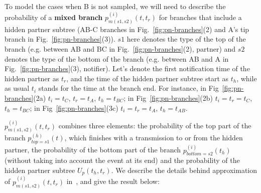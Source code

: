 \documentclass[10pt,letterpaper]{article}
\begin{document}
To model the cases when B is not sampled, we will need to describe the probability of a\textbf{ mixed branch} $p_{m(s1,s2)}^{(i)}(t,t_r)$ for branches that include a hidden partner subtree (AB-C branches in Fig.~\ref{fig:pn-branches}(2) and A's tip branch in Fig.~\ref{fig:pn-branches}(3)). $s1$ here denotes the type of the top of the branch (e.g. between AB and BC in Fig.~\ref{fig:pn-branches}(2), partner) and $s2$ denotes the type of the bottom of the branch (e.g. between AB and A in Fig.~\ref{fig:pn-branches}(3), notifier). Let's denote the first notification time of the hidden partner as $t_r$, and the time of the hidden partner subtree start as $t_h$, while as usual $t_i$ stands for the time at the branch end.  For instance, in Fig~\ref{fig:pn-branches}(2a) $t_i=t_C$, $t_r=t_A$, $t_h=t_{BC}$; in Fig~\ref{fig:pn-branches}(2b) $t_i=t_r=t_C$, $t_h=t_{BC}$; in Fig~\ref{fig:pn-branches}(3c) $t_i=t_r=t_A$, $t_h=t_{AB}$. 

$p_{m(s1,s2)}^{(i)}(t,t_r)$ combines three elements: the probability of the top part of the branch $p_{top=s1}^{(h)}(t)$, which finishes with a transmission to or from the hidden partner, the probability of the bottom part of the branch $p_{bottom=s2}^{(i)}(t_h)$ (without taking into account the event at its end) and the probability of the hidden partner subtree $U_p(t_h,t_r)$. We describe the details behind approximation of $p_{m(s1,s2)}^{(i)}(t,t_r)$ in~, and give the result below:
\end{document}
